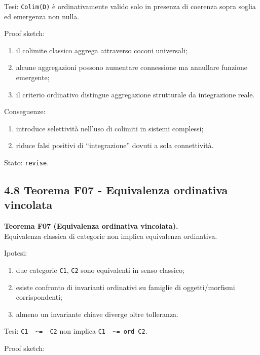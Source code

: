 Tesi:
\texttt{Colim(D)} è ordinativamente valido solo in presenza di coerenza sopra soglia ed emergenza non nulla.

Proof sketch:

\begin{enumerate}
\def\labelenumi{\arabic{enumi}.}
\tightlist
\item
  il colimite classico aggrega attraverso coconi universali;
\item
  alcune aggregazioni possono aumentare connessione ma annullare funzione emergente;
\item
  il criterio ordinativo distingue aggregazione strutturale da integrazione reale.
\end{enumerate}

Conseguenze:

\begin{enumerate}
\def\labelenumi{\arabic{enumi}.}
\tightlist
\item
  introduce selettività nell'uso di colimiti in sistemi complessi;
\item
  riduce falsi positivi di ``integrazione'' dovuti a sola connettività.
\end{enumerate}

Stato: \texttt{revise}.

\subsection{4.8 Teorema F07 - Equivalenza ordinativa vincolata}

\textbf{Teorema F07 (Equivalenza ordinativa vincolata).}\\
Equivalenza classica di categorie non implica equivalenza ordinativa.

Ipotesi:

\begin{enumerate}
\def\labelenumi{\arabic{enumi}.}
\tightlist
\item
  due categorie \texttt{C1}, \texttt{C2} sono equivalenti in senso classico;
\item
  esiste confronto di invarianti ordinativi su famiglie di oggetti/morfismi corrispondenti;
\item
  almeno un invariante chiave diverge oltre tolleranza.
\end{enumerate}

Tesi:
\texttt{C1\ \ \textasciitilde{}=\ \ C2} non implica \texttt{C1\ \ \textasciitilde{}=\ ord\ C2}.

Proof sketch:

